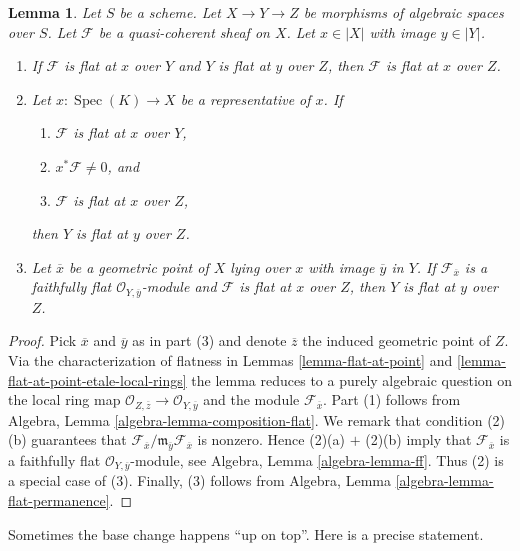 \documentclass{stacks-project}
\theoremstyle{plain}
\newtheorem{lemma}[subsection]{Lemma}
\theoremstyle{definition}
\theoremstyle{remark}
\numberwithin{equation}{subsection}
\def\Spec{\mathop{\mathrm{Spec}}}
\begin{document}
\begin{lemma}
\label{lemma-composition-module-flat}
Let $S$ be a scheme. Let $X \to Y \to Z$ be morphisms of algebraic spaces
over $S$. Let $\mathcal{F}$ be a quasi-coherent sheaf on $X$.
Let $x \in |X|$ with image $y \in |Y|$.
\begin{enumerate}
\item If $\mathcal{F}$ is flat at $x$ over $Y$ and
$Y$ is flat at $y$ over $Z$, then $\mathcal{F}$ is flat at
$x$ over $Z$.
\item Let $x : \Spec(K) \to X$ be a representative of $x$. If
\begin{enumerate}
\item $\mathcal{F}$ is flat at $x$ over $Y$,
\item $x^*\mathcal{F} \not = 0$, and
\item $\mathcal{F}$ is flat at $x$ over $Z$,
\end{enumerate}
then $Y$ is flat at $y$ over $Z$.
\item Let $\overline{x}$ be a geometric point of $X$ lying over $x$
with image $\overline{y}$ in $Y$. If $\mathcal{F}_{\overline{x}}$ is a
faithfully flat $\mathcal{O}_{Y, \overline{y}}$-module and
$\mathcal{F}$ is flat at $x$ over $Z$, then
$Y$ is flat at $y$ over $Z$.
\end{enumerate}
\end{lemma}

\begin{proof}
Pick $\overline{x}$ and $\overline{y}$ as in part (3) and denote
$\overline{z}$ the induced geometric point of $Z$. Via the
characterization of flatness in
Lemmas \ref{lemma-flat-at-point} and
\ref{lemma-flat-at-point-etale-local-rings}
the lemma reduces to a purely algebraic question on the local
ring map $\mathcal{O}_{Z, \overline{z}} \to \mathcal{O}_{Y, \overline{y}}$
and the module $\mathcal{F}_{\overline{x}}$.
Part (1) follows from
Algebra, Lemma \ref{algebra-lemma-composition-flat}.
We remark that condition (2)(b) guarantees that
$\mathcal{F}_{\overline{x}}/
\mathfrak m_{\overline{y}} \mathcal{F}_{\overline{x}}$
is nonzero. Hence (2)(a) $+$ (2)(b) imply that $\mathcal{F}_{\overline{x}}$
is a faithfully flat $\mathcal{O}_{Y, \overline{y}}$-module, see
Algebra, Lemma \ref{algebra-lemma-ff}.
Thus (2) is a special case of (3).
Finally, (3) follows from
Algebra, Lemma \ref{algebra-lemma-flat-permanence}.
\end{proof}

\noindent
Sometimes the base change happens ``up on top''. Here is a precise statement.
\end{document}
